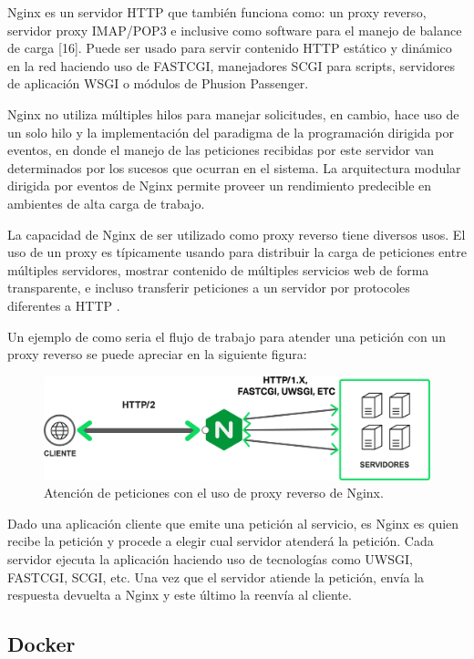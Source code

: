 Nginx es un servidor HTTP que también funciona como: un proxy reverso, servidor
proxy IMAP/POP3 e inclusive como software para el manejo de balance de carga [16].
Puede ser usado para servir contenido HTTP estático y dinámico en la red haciendo uso
de FASTCGI, manejadores SCGI para scripts, servidores de aplicación WSGI o módulos
de Phusion Passenger.

Nginx no utiliza múltiples hilos para manejar solicitudes, en cambio, hace uso de un
solo hilo y la implementación del paradigma de la programación dirigida por eventos,
en donde el manejo de las peticiones recibidas por este servidor van determinados por
los sucesos que ocurran en el sistema. La arquitectura modular dirigida por eventos de
Nginx permite proveer un rendimiento predecible en ambientes de alta carga de
trabajo.

La capacidad de Nginx de ser utilizado como proxy reverso tiene diversos usos.
El uso de un proxy es típicamente usando para distribuir la carga de peticiones
entre múltiples servidores, mostrar contenido de múltiples servicios web de forma transparente,
e incluso transferir peticiones a un servidor por protocoles diferentes a HTTP \cite{22}.

Un ejemplo de como seria el flujo de trabajo para atender una petición con un proxy reverso se puede apreciar en la siguiente figura:

\begin{figure}[H]
	\centering
		\includegraphics[width=.9\textwidth]{figures/nginx_reverse_proxy}
	\caption{Atención de peticiones con el uso de proxy reverso de Nginx.}
	\label{fig:nginx_reverse_proxy}
\end{figure}

Dado una aplicación cliente que emite una petición al servicio, es Nginx es quien recibe la petición y procede a elegir cual servidor
atenderá la petición. Cada servidor ejecuta la aplicación haciendo uso de tecnologías como UWSGI, FASTCGI, SCGI, etc. Una vez que el
servidor atiende la petición, envía la respuesta devuelta a Nginx y este último la reenvía al cliente.


\subsection{Docker}

